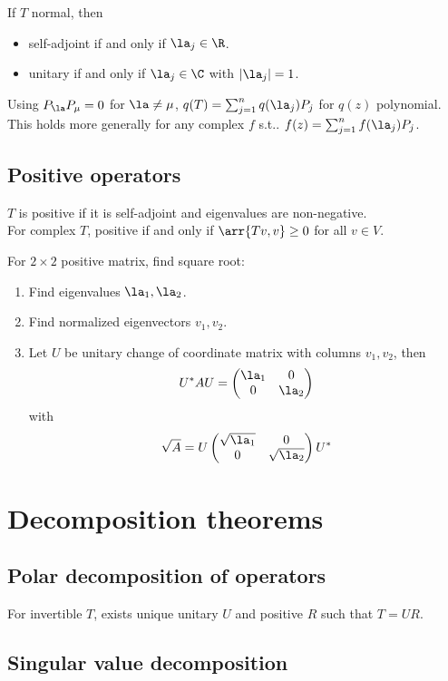 \documentclass[10pt]{LatexTemplate/hw}
\begin{document}
\begin{multicols*}{2}
If $T$ normal, then 
\begin{itemize}
    \item self-adjoint if and only if $\la_j\in\R$.
    \item unitary if and only if $\la_j\in\C$ with $|\la_j|=1$.
\end{itemize}

Using $P_\la P_\mu=0$ for $\la\ne\mu$, $q(T)=\sum_{j=1}^n q(\la_j)P_j$ for $q(z)$ polynomial.\\
This holds more generally for any complex $f$ s.t.. $f(z)=\sum_{j=1}^n f(\la_j)P_j$.

\subsection{Positive operators}
$T$ is positive if it is self-adjoint and eigenvalues are non-negative.\\ 
For complex $T$, positive if and only if $\arr{Tv,v}\ge0$ for all $v\in V$.

For $2\times2$ positive matrix, find square root:
\begin{enumerate}
    \item Find eigenvalues $\la_1,\la_2$.
    \item Find normalized eigenvectors $v_1,v_2$.
    \item Let $U$ be unitary change of coordinate matrix with columns $v_1,v_2$, then $$U^*AU=\begin{pmatrix}
    \la_1 & 0 \\
    0 & \la_2
    \end{pmatrix}$$ with $$\sqrt{A}=U\begin{pmatrix}
    \sqrt{\la_1} & 0 \\
    0 & \sqrt{\la_2}
    \end{pmatrix}U^*$$
\end{enumerate}
\section{Decomposition theorems}
\subsection{Polar decomposition of operators}
For invertible $T$, exists unique unitary $U$ and positive $R$ such that $T=UR$.\\
\subsection{Singular value decomposition}

\end{multicols*}
\end{document}
